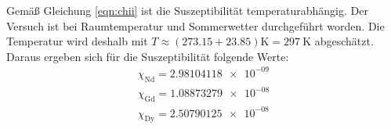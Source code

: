 Gemäß Gleichung \eqref{eqn:chii} ist die Suszeptibilität temperaturabhängig. 
Der Versuch ist bei Raumtemperatur und Sommerwetter durchgeführt worden. 
Die Temperatur wird deshalb mit ${T\approx(\num{273.15}+\num{23.85})\si{\kelvin}=\SI{297}{\kelvin}}$ abgeschätzt.
Daraus ergeben sich für die Suszeptibilität folgende Werte:
\begin{align*}
    \chi _\text{Nd}=\num{2.98104118e-09} \\
    \chi _\text{Gd}=\num{1.08873279e-08} \\
    \chi _\text{Dy}=\num{2.50790125e-08} 
\end{align*}